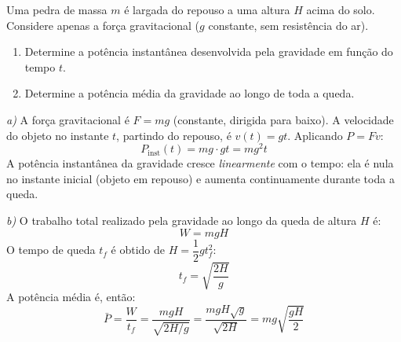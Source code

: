 \begin{exemplo}\label{exemplo_energia_potenciaex03}
Uma pedra de massa $m$ é largada do repouso a uma altura $H$ acima do solo.
Considere apenas a força gravitacional ($g$ constante, sem resistência do ar).

\begin{enumerate}
    \item [a)] Determine a potência instantânea desenvolvida pela gravidade em
    função do tempo $t$.

    \item [b)] Determine a potência média da gravidade ao longo de toda a queda.

   
\end{enumerate}

\resolucao

\noindent\textit{a)} A força gravitacional é $F = mg$ (constante, dirigida para baixo).
A velocidade do objeto no instante $t$, partindo do repouso, é $v(t) = gt$.
Aplicando $P = Fv$:
\[
    P_{\text{inst}}(t) = mg \cdot gt = mg^2 t
\]
A potência instantânea da gravidade cresce \textit{linearmente} com o tempo:
ela é nula no instante inicial (objeto em repouso) e aumenta continuamente
durante toda a queda.

\medskip
\noindent\textit{b)} O trabalho total realizado pela gravidade ao longo da queda de
altura $H$ é:
\[
    W = mgH
\]
O tempo de queda $t_f$ é obtido de $H = \dfrac{1}{2}g t_f^2$:
\[
    t_f = \sqrt{\frac{2H}{g}}
\]
A potência média é, então:
\[
    \bar{P}
    = \frac{W}{t_f}
    = \frac{mgH}{\sqrt{2H/g}}
    = \frac{mgH\sqrt{g}}{\sqrt{2H}}
    = mg\sqrt{\frac{gH}{2}}
\]


\end{exemplo}

